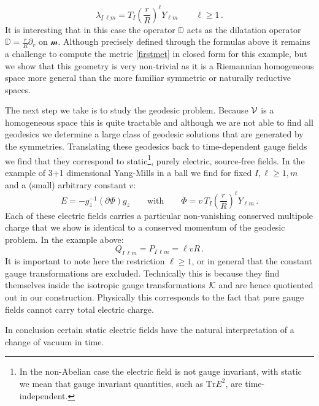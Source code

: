 \documentclass[11pt,a4paper]{article}
\def\calk{{\cal K}}
\def\calsm{{\boldsymbol{\mathscr m}}}
\def\calv{{\cal V}}
\def\ulm{{\underline{\ell m}}}
\def\uI{{\underline{I}}}
\def\Tr{\mathrm{Tr}}
\def\Dperp{{\mathbb{D}}}
\def\grad{{\partial}}
\begin{document}
    \begin{equation}
    \lambda_{\uI\,\ulm}=T_I\left(\frac{r}{R}\right)^\ell Y_{\ell m}\qquad \ell\geq 1\,.
    \end{equation}
    It is interesting that in this case the operator $\Dperp$ acts as the dilatation operator $\Dperp=\frac{r}{R}\partial_r$ on $\calsm$. Although precisely defined through the formulas above it remains a challenge to compute the metric \eqref{firstmet} in closed form for this example, but we show that this geometry is very non-trivial as it is a Riemannian homogeneous space more general than the more familiar symmetric or naturally reductive spaces.
    
    The next step we take is to study the geodesic problem. Because $\calv$ is a homogeneous space this is quite tractable and although we are not able to find all geodesics we determine a large class of geodesic solutions that are generated by the symmetries. Translating these geodesics back to time-dependent gauge fields we find that they correspond to static\footnote{In the non-Abelian case the electric field is not gauge invariant, with static we mean that gauge invariant quantities, such as $\Tr E^2$, are time-independent.}, purely electric, source-free fields. In the example of 3+1 dimensional Yang-Mills in a ball we find for fixed $I,\ell\geq 1, m$ and a (small) arbitrary constant $v$:
    \begin{equation}
    E=-g_z^{-1}\left(\grad \Phi\right)g_z\qquad\mbox{with}\qquad \Phi=v\, T_I\left(\frac{r}{R}\right)^\ell Y_{\ell m}\,.
    \end{equation}
    Each of these electric fields carries a particular non-vanishing conserved multipole charge that we show is identical to a conserved momentum of the geodesic problem. In the example above:
    \begin{equation}
    Q_{I\,\ell m}=P_{I\,\ell m}=\ell v R\,.
    \end{equation}
    It is important to note here the restriction $\ell \geq 1$, or in general that the constant gauge transformations are excluded. Technically this is because they find themselves inside the isotropic gauge transformations $\calk$ and are hence quotiented out in our construction. Physically this corresponds to the fact that pure gauge fields cannot carry total electric charge.
    
    In conclusion certain static electric fields have the natural interpretation of a change of vacuum in time.\\
    
\end{document}
